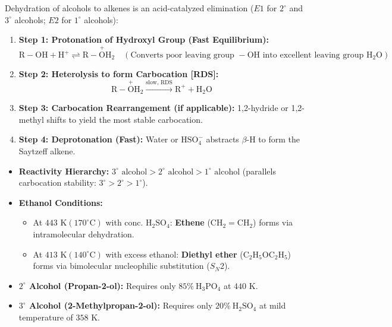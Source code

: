 \documentclass[10pt,a4paper]{article}
\begin{document}
\begin{conceptbox}
Dehydration of alcohols to alkenes is an acid-catalyzed elimination ($E1$ for $2^\circ$ and $3^\circ$ alcohols; $E2$ for $1^\circ$ alcohols):
\begin{enumerate}[leftmargin=*]
  \item \textbf{Step 1: Protonation of Hydroxyl Group (Fast Equilibrium):}
  \begin{equation}
    \mathrm{R-OH} + \mathrm{H^+} \rightleftharpoons \mathrm{R-\overset{+}{O}H_2} \quad (\text{Converts poor leaving group } -\mathrm{OH} \text{ into excellent leaving group } \mathrm{H_2O})
  \end{equation}
  \item \textbf{Step 2: Heterolysis to form Carbocation [RDS]:}
  \begin{equation}
    \mathrm{R-\overset{+}{O}H_2} \xrightarrow{\text{slow, RDS}} \mathrm{R}^+ + \mathrm{H_2O}
  \end{equation}
  \item \textbf{Step 3: Carbocation Rearrangement (if applicable):} 1,2-hydride or 1,2-methyl shifts to yield the most stable carbocation.
  \item \textbf{Step 4: Deprotonation (Fast):} Water or $\mathrm{HSO_4^-}$ abstracts $\beta$-H to form the Saytzeff alkene.
\end{enumerate}
\end{conceptbox}

\begin{ncertbox}
\begin{itemize}
  \item \textbf{Reactivity Hierarchy:} $3^\circ \text{ alcohol} > 2^\circ \text{ alcohol} > 1^\circ \text{ alcohol}$ (parallels carbocation stability: $3^\circ > 2^\circ > 1^\circ$).
  \item \textbf{Ethanol Conditions:}
  \begin{itemize}
    \item At $443\text{ K} (170^\circ\mathrm{C})$ with conc. $\mathrm{H_2SO_4}$: \textbf{Ethene} ($\mathrm{CH_2=CH_2}$) forms via intramolecular dehydration.
    \item At $413\text{ K} (140^\circ\mathrm{C})$ with excess ethanol: \textbf{Diethyl ether} ($\mathrm{C_2H_5OC_2H_5}$) forms via bimolecular nucleophilic substitution ($S_N2$).
  \end{itemize}
  \item \textbf{$2^\circ$ Alcohol (Propan-2-ol):} Requires only $85\% \ \mathrm{H_3PO_4}$ at $440\text{ K}$.
  \item \textbf{$3^\circ$ Alcohol (2-Methylpropan-2-ol):} Requires only $20\% \ \mathrm{H_2SO_4}$ at mild temperature of $358\text{ K}$.
\end{itemize}
\end{ncertbox}
\end{document}
